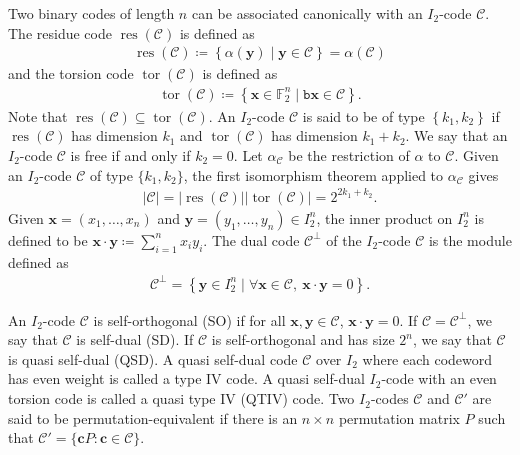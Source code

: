 \documentclass[12pt]{article}
\theoremstyle{definition}
\theoremstyle{plain}
\begin{document}
Two binary codes of length $n$ can be associated canonically with an $I_2$-code $\mathcal{C}$. The residue code $\operatorname{res}(\mathcal{C})$ is defined as
\begin{align*}
\operatorname{res} (\mathcal{C})  \coloneqq  \left\lbrace   \alpha ( \mathbf{y} )  \mid  \mathbf{y}  \in \mathcal{C}  \right \rbrace  =   \alpha (\mathcal{C} )
\end{align*}
and the torsion code  $\operatorname{tor}(\mathcal{C})$  is defined as
\begin{align*}
\operatorname{tor}(\mathcal{C}) \coloneqq \left\{\mathbf{x} \in \mathbb{F}_{2}^{n}  \mid   \mathtt{b}  \mathbf{x} \in \mathcal{C}  \right\}  .
\end{align*}
Note that $\operatorname{res}(\mathcal{C}) \subseteq \operatorname{tor}(\mathcal{C})$. An $I_2$-code $\mathcal{C}$ is said to be of type $\left \{  k_{1}, k_{2}  \right  \}$ if $\operatorname{res} (\mathcal{C})$ has dimension $k_1$ and $\operatorname{tor} (\mathcal{C})$ has dimension $k_1 + k_2$. We say that an $I_2$-code $\mathcal{C}$ is free if and only if $k_2 = 0$. Let $\alpha_\mathcal{C}$ be the restriction of $\alpha$ to $\mathcal{C}$. Given an $I_2$-code $\mathcal{C}$ of type $\{ k_1 , k_2\}$, the first isomorphism theorem applied to $\alpha_\mathcal{C}$ gives
\begin{align*}
|\mathcal{C}|=|\operatorname{res}(\mathcal{C})||\operatorname{tor}(\mathcal{C})|=2^{2 k_{1}+k_{2}} .
\end{align*}
Given $\mathbf{x} = (x_1 , \dotsc , x_n)$ and $\mathbf{y} = ( y_1 , \dotsc , y_n) \in I_2^n$, the inner product on $I_2^n$ is defined to be $ \mathbf{x} \cdot \mathbf{y}  \coloneqq \sum_{i=1}^{n} x_i y_i$. The dual code $\mathcal{C}^{\perp}$ of the $I_2$-code $\mathcal{C}$ is the module defined as
\begin{align*}
\mathcal{C}^{\perp}=\left\{\mathbf{y} \in I_{2}^{n} \mid \forall \mathbf{x} \in \mathcal{C} ,  \  \mathbf{x}  \cdot \mathbf{y} = 0   \right\}  .
\end{align*}


An $I_{2}$-code $\mathcal{C}$ is self-orthogonal (SO) if for all $\mathbf{x}, \mathbf{y} \in \mathcal{C}$, $\mathbf{x}  \cdot \mathbf{y} = 0$. If $\mathcal{C}=\mathcal{C}^{\perp}$, we say that $\mathcal{C}$ is self-dual (SD). If $\mathcal{C}$ is self-orthogonal and has size $2^n$, we say that $\mathcal{C}$ is quasi self-dual (QSD). A quasi self-dual code $\mathcal{C}$ over $I_2$ where each  codeword has even weight is called a type IV code. A quasi self-dual $I_2$-code with an even torsion code is called a quasi type IV (QTIV) code. Two $I_{2}$-codes $\mathcal{C}$ and $\mathcal{C}'$ are said to be permutation-equivalent if there is an $n \times n$ permutation matrix $P$ such that $\mathcal{C}' = \{ \mathbf{c} P \mathrel{:} \mathbf{c} \in \mathcal{C}    \}$.
\end{document}
